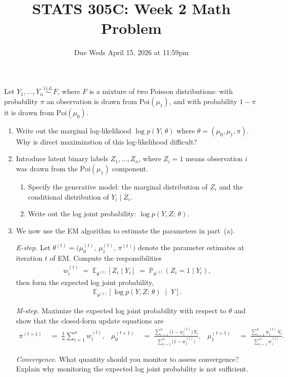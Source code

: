 \documentclass[11pt]{article}
\title{STATS 305C: Week 2 Math Problem}
\date{Due Weds April 15, 2026 at 11:59pm}
\begin{document}
\maketitle
\noindent
Let $Y_1, \ldots, Y_n \overset{\text{i.i.d.}}{\sim} F$, where $F$ is a mixture of two
Poisson distributions: with probability $\pi$ an observation is drawn from
$\mathrm{Poi}(\mu_1)$, and with probability $1 - \pi$ it is drawn from
$\mathrm{Poi}(\mu_0)$.
\begin{enumerate}[label=(\alph*)]
    \item Write out the marginal log-likelihood $\log p(Y;\, \theta)$ where $\theta = (\mu_0, \mu_1, \pi)$. Why is direct
    maximization of this log-likelihood difficult?
    \item Introduce latent binary labels $Z_1, \ldots, Z_n$, where $Z_i = 1$ means
    observation $i$ was drawn from the $\mathrm{Poi}(\mu_1)$ component.
    \begin{enumerate}[label=(\roman*)]
        \item Specify the generative model: the marginal distribution of $Z_i$
        and the conditional distribution of $Y_i \mid Z_i$.
        \item Write out the log joint probability:
        $\log p(Y, Z;\, \theta)$.
    \end{enumerate}
    \item We now use the EM algorithm to estimate the parameters in part~(a).
    \medskip

    \noindent\textit{E-step.}
    Let
    $\theta^{(t)} = \bigl(\mu_0^{(t)},\, \mu_1^{(t)},\, \pi^{(t)}\bigr)$ denote the parameter estimates at iteration $t$ of EM.
    Compute the responsibilities
    \begin{align*}
        w_i^{(t)}
        \;=\;
        \mathbb{E}_{\theta^{(t)}}[Z_i \mid Y_i]
        \;=\;
        \mathbb{P}_{\theta^{(t)}}(Z_i = 1 \mid Y_i),
    \end{align*}
    then form the expected log joint probability,
    \begin{align*}
        \mathbb{E}_{\theta^{(t)}}\!\left[\log p(Y, Z;\, \theta) \;\middle|\; Y\right].
    \end{align*}

    \medskip
    \noindent\textit{M-step.}
    Maximize the expected log joint probability with respect to $\theta$ and
    show that the closed-form update equations are
    \begin{align*}
        \pi^{(t+1)}
        &\;=\;
        \frac{1}{n}\sum_{i=1}^n w_i^{(t)}, &
        \mu_0^{(t+1)}
        &\;=\;
        \frac{\displaystyle\sum_{i=1}^n \bigl(1 - w_i^{(t)}\bigr)\,Y_i}
             {\displaystyle\sum_{i=1}^n \bigl(1 - w_i^{(t)}\bigr)}, &
        \mu_1^{(t+1)}
        &\;=\;
        \frac{\displaystyle\sum_{i=1}^n w_i^{(t)}\,Y_i}
             {\displaystyle\sum_{i=1}^n w_i^{(t)}}.
    \end{align*}

    \medskip
    \noindent\textit{Convergence.}
    What quantity should you monitor to assess convergence? Explain why monitoring
    the expected log joint probability is not sufficient.
\end{enumerate}
\end{document}

